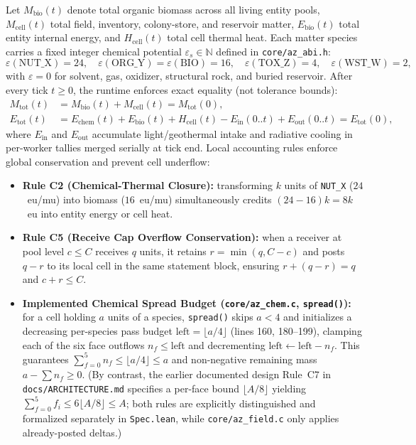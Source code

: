 \documentclass[11pt,reqno]{amsart}
\newcommand{\code}[1]{\texttt{\footnotesize #1}}
\newcommand{\us}{\_\allowbreak}
\newcommand{\slsh}{/\allowbreak}
\begin{document}
Let $M_{\mathrm{bio}}(t)$ denote total organic biomass across all living entity pools, $M_{\mathrm{cell}}(t)$ total field, inventory, colony-store, and reservoir matter, $E_{\mathrm{bio}}(t)$ total entity internal energy, and $H_{\mathrm{cell}}(t)$ total cell thermal heat. Each matter species carries a fixed integer chemical potential $\varepsilon_s \in \mathbb{N}$ defined in \code{core\slsh az\us abi.h}:
\begin{equation}
  \varepsilon(\text{NUT\_X}) = 24, \quad
  \varepsilon(\text{ORG\_Y}) = \varepsilon(\text{BIO}) = 16, \quad
  \varepsilon(\text{TOX\_Z}) = 4, \quad
  \varepsilon(\text{WST\_W}) = 2,
\end{equation}
with $\varepsilon = 0$ for solvent, gas, oxidizer, structural rock, and buried reservoir. After every tick $t \ge 0$, the runtime enforces exact equality (not tolerance bounds):
\begin{align}
  M_{\mathrm{tot}}(t) &= M_{\mathrm{bio}}(t) + M_{\mathrm{cell}}(t) = M_{\mathrm{tot}}(0), \\
  E_{\mathrm{tot}}(t) &= E_{\mathrm{chem}}(t) + E_{\mathrm{bio}}(t) + H_{\mathrm{cell}}(t) - E_{\mathrm{in}}(0..t) + E_{\mathrm{out}}(0..t) = E_{\mathrm{tot}}(0),
\end{align}
where $E_{\mathrm{in}}$ and $E_{\mathrm{out}}$ accumulate light/geothermal intake and radiative cooling in per-worker tallies merged serially at tick end. Local accounting rules enforce global conservation and prevent cell underflow:
\begin{itemize}[leftmargin=1.8em,itemsep=2pt]
  \item \textbf{Rule C2 (Chemical-Thermal Closure):} transforming $k$ units of \code{NUT\us X} ($24$~eu/mu) into biomass ($16$~eu/mu) simultaneously credits $(24 - 16)k = 8k$~eu into entity energy or cell heat.
  \item \textbf{Rule C5 (Receive Cap Overflow Conservation):} when a receiver at pool level $c \le C$ receives $q$ units, it retains $r = \min(q, C - c)$ and posts $q - r$ to its local cell in the same statement block, ensuring $r + (q - r) = q$ and $c + r \le C$.
  \item \textbf{Implemented Chemical Spread Budget (\code{core\slsh az\us chem.c}, \code{spread()}):} for a cell holding $a$ units of a species, \code{spread()} skips $a < 4$ and initializes a decreasing per-species pass budget $\text{left} = \lfloor a / 4 \rfloor$ (lines 160, 180--199), clamping each of the six face outflows $n_f \le \text{left}$ and decrementing $\text{left} \leftarrow \text{left} - n_f$. This guarantees $\sum_{f=0}^{5} n_f \le \lfloor a / 4 \rfloor \le a$ and non-negative remaining mass $a - \sum n_f \ge 0$. (By contrast, the earlier documented design Rule~C7 in \code{docs\slsh ARCHITECTURE.md} specifies a per-face bound $\lfloor A / 8 \rfloor$ yielding $\sum_{f=0}^{5} f_i \le 6 \lfloor A / 8 \rfloor \le A$; both rules are explicitly distinguished and formalized separately in \code{Spec.lean}, while \code{core\slsh az\us field.c} only applies already-posted deltas.)
\end{itemize}
\end{document}
